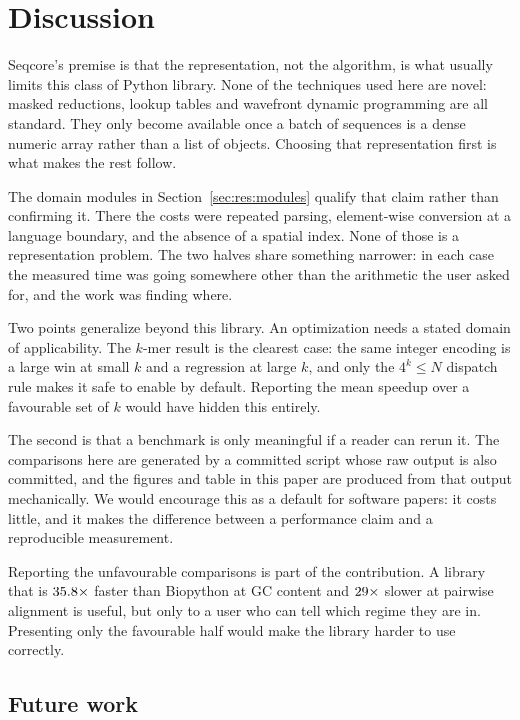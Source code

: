 \documentclass[10pt,letterpaper]{article}
\begin{document}
\section{Discussion}

Seqcore's premise is that the representation, not the algorithm, is what usually
limits this class of Python library. None of the techniques used here are
novel: masked reductions, lookup tables and wavefront dynamic programming are
all standard. They only become available once a batch of sequences is a dense
numeric array rather than a list of objects. Choosing that
representation first is what makes the rest follow.

The domain modules in Section~\ref{sec:res:modules} qualify that claim rather
than confirming it. There the costs were repeated parsing, element-wise
conversion at a language boundary, and the absence of a spatial index. None of
those is a representation problem. The two halves share something narrower: in
each case the measured time was going somewhere other than the arithmetic the
user asked for, and the work was finding where.

Two points generalize beyond this library. An optimization needs a stated
domain of applicability. The $k$-mer result is the clearest case:
the same integer encoding is a large win at small $k$ and a regression at large
$k$, and only the $4^k \le N$ dispatch rule makes it safe to enable by default.
Reporting the mean speedup over a favourable set of $k$ would have hidden this
entirely.

The second is that a benchmark is only meaningful if a reader can rerun it. The
comparisons here are generated by a committed script whose raw output is also
committed, and the figures and table in this paper are produced from that output
mechanically. We would encourage this as a default for software papers: it costs
little, and it makes the difference between a performance claim and a
reproducible measurement.

Reporting the unfavourable comparisons is part of the contribution. A library
that is $35.8\times$ faster
than Biopython at GC content and $29\times$ slower at pairwise alignment is
useful, but only to a user who can tell which regime they are in. Presenting only
the favourable half would make the library harder to use correctly.

\subsection*{Future work}
\end{document}
